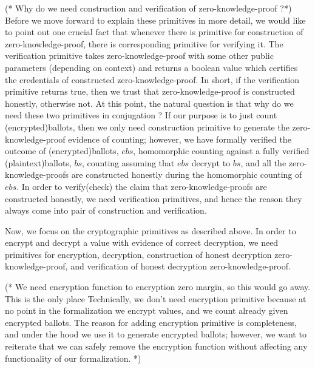 \documentclass{llncs}
\begin{document}
(* Why do we need construction and verification of zero-knowledge-proof ?*)
Before we move forward to explain these primitives in more detail,
we would like to point out one crucial fact that  whenever 
there is primitive for construction of zero-knowledge-proof, 
there is corresponding primitive for verifying it. 
The verification primitive takes zero-knowledge-proof with some 
other public parameters (depending on context) 
and returns a boolean value which certifies the credentials of constructed 
zero-knowledge-proof. In short, if the verification primitive returns 
true, then we trust that zero-knowledge-proof is constructed honestly, 
otherwise not. At this point, the natural question is that
why do we need these two primitives in conjugation ? If our purpose 
is to just count (encrypted)ballots, then we only need 
construction primitive
to generate the zero-knowledge-proof evidence of counting; however, 
we have formally verified the outcome of (encrypted)ballots, $ebs$, 
homomorphic counting against 
a fully verified (plaintext)ballots, $bs$, counting\cite{Pattinson:2017:SVE}
assuming that $ebs$ decrypt to $bs$, 
and all the zero-knowledge-proofs are constructed honestly during the 
homomorphic counting of $ebs$.
In order to verify(check) the claim that zero-knowledge-proofs are constructed 
honestly, we need verification primitives, and hence the reason they 
always come into pair of construction and verification. 

   
Now, we focus on the  cryptographic primitives as described above. 
In order to encrypt and decrypt a value with 
evidence of correct decryption, we need primitives for encryption, 
decryption, construction of
honest decryption zero-knowledge-proof, and verification of 
honest decryption zero-knowledge-proof.


(* We need encryption function to encryption zero margin, 
so this would go away. This is the only place  
Technically, we don't need 
encryption primitive because at no point in the formalization we 
encrypt values, and we count already given encrypted ballots. 
The reason for adding encryption primitive is completeness, and 
under the hood we use it to generate encrypted ballots; however, we
want to reiterate that we can safely remove the encryption function 
without affecting any functionality of our formalization. *)
\end{document}

